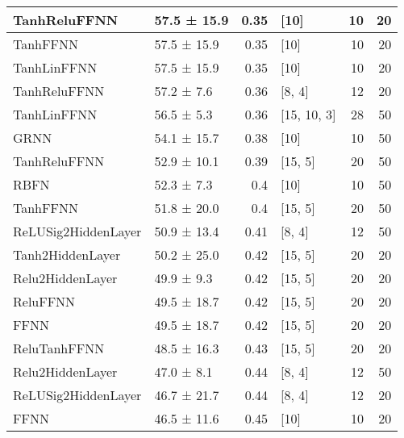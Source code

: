 \begin{longtable}{llrlrr}
 \hline
TanhReluFFNN                        & 57.5 ± 15.9 &  0.35 & [10]           &         10 &       20 \\
 \hline
TanhFFNN                            & 57.5 ± 15.9 &  0.35 & [10]           &         10 &       20 \\
 \hline
TanhLinFFNN                         & 57.5 ± 15.9 &  0.35 & [10]           &         10 &       20 \\
 \hline
TanhReluFFNN                        & 57.2 ± 7.6  &  0.36 & [8, 4]         &         12 &       20 \\
 \hline
TanhLinFFNN                         & 56.5 ± 5.3  &  0.36 & [15, 10, 3]    &         28 &       50 \\
 \hline
GRNN                                & 54.1 ± 15.7 &  0.38 & [10]           &         10 &       50 \\
 \hline
TanhReluFFNN                        & 52.9 ± 10.1 &  0.39 & [15, 5]        &         20 &       50 \\
 \hline
RBFN                                & 52.3 ± 7.3  &  0.4  & [10]           &         10 &       50 \\
 \hline
TanhFFNN                            & 51.8 ± 20.0 &  0.4  & [15, 5]        &         20 &       50 \\
 \hline
ReLUSig2HiddenLayer                 & 50.9 ± 13.4 &  0.41 & [8, 4]         &         12 &       50 \\
 \hline
Tanh2HiddenLayer                    & 50.2 ± 25.0 &  0.42 & [15, 5]        &         20 &       20 \\
 \hline
Relu2HiddenLayer                    & 49.9 ± 9.3  &  0.42 & [15, 5]        &         20 &       20 \\
 \hline
ReluFFNN                            & 49.5 ± 18.7 &  0.42 & [15, 5]        &         20 &       20 \\
 \hline
FFNN                                & 49.5 ± 18.7 &  0.42 & [15, 5]        &         20 &       20 \\
 \hline
ReluTanhFFNN                        & 48.5 ± 16.3 &  0.43 & [15, 5]        &         20 &       20 \\
 \hline
Relu2HiddenLayer                    & 47.0 ± 8.1  &  0.44 & [8, 4]         &         12 &       50 \\
 \hline
ReLUSig2HiddenLayer                 & 46.7 ± 21.7 &  0.44 & [8, 4]         &         12 &       20 \\
 \hline
FFNN                                & 46.5 ± 11.6 &  0.45 & [10]           &         10 &       20 \\

\end{longtable}
